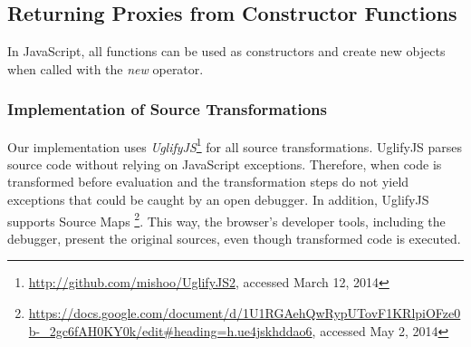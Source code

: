 \subsection{Returning Proxies from Constructor Functions} 

In JavaScript, all functions can be used as constructors and create new objects when called with the \emph{new} operator.


















\subsubsection{Implementation of Source Transformations}

Our implementation uses \emph{UglifyJS}\footnote{\url{http://github.com/mishoo/UglifyJS2}, accessed March 12, 2014} for all source transformations.
UglifyJS parses source code without relying on JavaScript exceptions.
Therefore, when code is transformed before evaluation and the transformation steps do not yield exceptions that could be caught by an open debugger.
In addition, UglifyJS supports Source Maps \footnote{\url{https://docs.google.com/document/d/1U1RGAehQwRypUTovF1KRlpiOFze0b-_2gc6fAH0KY0k/edit\#heading=h.ue4jskhddao6}, accessed May 2, 2014}.
This way, the browser's developer tools, including the debugger, present the original sources, even though transformed code is executed.

